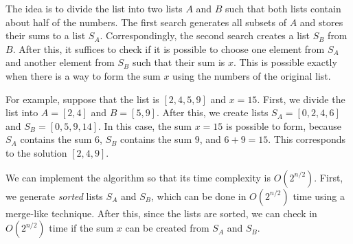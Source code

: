 The idea is to divide the list into
two lists $A$ and $B$ such that both
lists contain about half of the numbers.
The first search generates all subsets
of $A$ and stores their sums to a list $S_A$.
Correspondingly, the second search creates
a list $S_B$ from $B$.
After this, it suffices to check if it is possible
to choose one element from $S_A$ and another
element from $S_B$ such that their sum is $x$.
This is possible exactly when there is a way to
form the sum $x$ using the numbers of the original list.

For example, suppose that the list is $[2,4,5,9]$ and $x=15$.
First, we divide the list into $A=[2,4]$ and $B=[5,9]$.
After this, we create lists
$S_A=[0,2,4,6]$ and $S_B=[0,5,9,14]$.
In this case, the sum $x=15$ is possible to form,
because $S_A$ contains the sum $6$,
$S_B$ contains the sum $9$, and $6+9=15$.
This corresponds to the solution $[2,4,9]$.

We can implement the algorithm so that
its time complexity is $O(2^{n/2})$.
First, we generate \emph{sorted} lists $S_A$ and $S_B$,
which can be done in $O(2^{n/2})$ time using a merge-like technique.
After this, since the lists are sorted,
we can check in $O(2^{n/2})$ time if
the sum $x$ can be created from $S_A$ and $S_B$.